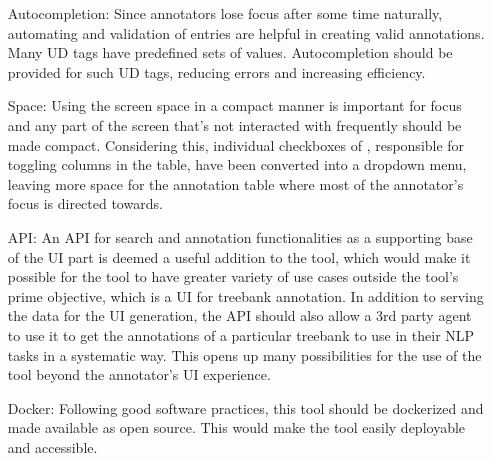 \begin{itemize}[before=\normalfont, font=\itshape, align=left]
    \item[Autocompletion:]
        Since annotators lose focus after some time naturally, automating and validation of entries are helpful in creating valid annotations.
        Many UD tags have predefined sets of values.
        Autocompletion should be provided for such UD tags, reducing errors and increasing efficiency.

    \item[Space:]
        Using the screen space in a compact manner is important for focus and any part of the screen that's not interacted with frequently should be made compact.
        Considering this, individual checkboxes of \boatvone, responsible for toggling columns in the table, have been converted into a dropdown menu, leaving more space for the annotation table where most of the annotator's focus is directed towards.

    \item[API:]
        An API for search and annotation functionalities as a supporting base of the UI part is deemed a useful addition to the tool, which would make it possible for the tool to have greater variety of use cases outside the tool's prime objective, which is a UI for treebank annotation.
        In addition to serving the data for the UI generation, the API should also allow a 3rd party agent to use it to get the annotations of a particular treebank to use in their NLP tasks in a systematic way.
        This opens up many possibilities for the use of the tool beyond the annotator's UI experience.

    \item[Docker:]
        Following good software practices, this tool should be dockerized and made available as open source.
        This would make the tool easily deployable and accessible.
\end{itemize}
